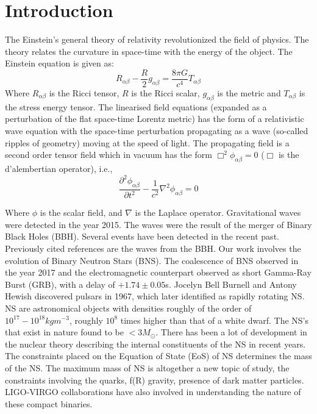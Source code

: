 \documentclass[preprint,12pt]{elsarticle}
\begin{document}

\section{Introduction}
\label{S:1}
The Einstein's general theory of relativity revolutionized the field of physics\citep{Einstein:1916}. The theory relates the curvature in space-time with the energy of the object. The Einstein equation is given as:
\begin{equation}
R_{\alpha\beta}-\frac{R}{2}g_{\alpha\beta} = \frac{8\pi G}{c^4}T_{\alpha\beta}    
\end{equation}
Where $R_{\alpha\beta}$ is the Ricci tensor, $R$ is the Ricci scalar, $g_{\alpha\beta}$ is the metric and $T_{\alpha\beta}$ is the stress energy tensor. The linearised field equations (expanded as a perturbation of the flat space-time Lorentz metric) has the form of a relativistic wave equation with the space-time perturbation propagating as a wave (so-called ripples of geometry) moving at the speed of light. The propagating field is a second order tensor field which in vacuum has the form $\Box^2 \phi_{\alpha \beta}=0$\citep{Einstein:1918} ($\Box$ is the d'alembertian operator), i.e.,
\begin{equation}
\frac{\partial^2 \phi_{\alpha \beta}}{\partial t^2}-\frac{1}{c^2}\nabla^2\phi_{\alpha \beta} = 0
\end{equation}

Where $\phi$ is the scalar field, and $\nabla$ is the Laplace operator. Gravitational waves were detected in the year 2015\citep{Abbott:2016}. The waves were the result of the merger of Binary Black Holes (BBH). Several events have been detected in the recent past\citep{Abbott:2017, Abbott:2017b, Abbott:2017c}. Previously cited references are the waves from the BBH. Our work involves the evolution of Binary Neutron Stars (BNS). The coalescence of BNS observed in the year 2017\citep{Abbott:2017d} and the electromagnetic counterpart observed as short Gamma-Ray Burst (GRB), with a delay of $+ 1.74 \pm 0.05$s\citep{Abbott:2017e, Goldstein:2017}. Jocelyn Bell Burnell and Antony Hewish discovered pulsars in 1967\citep{Hewish:1968}, which later identified as rapidly rotating NS. NS are astronomical objects with densities roughly of the order of $10^{17}-10^{18} kg m^{-3}$\citep{Hartle:1977, Goldman:1989}, roughly $10^8$ times higher than that of a white dwarf. The NS's that exist in nature found to be $<3M_{\odot}$. There has been a lot of development in the nuclear theory describing the internal constituents of the NS in recent years. The constraints placed on the Equation of State (EoS) of NS determines the mass of the NS. The maximum mass of NS is altogether a new topic of study, the constraints involving the quarks\citep{Weber:2006}, f(R) gravity\citep{Capozziello:2016}, presence of dark matter particles\citep{KUMAR:2020}. LIGO-VIRGO collaborations have also involved in understanding the nature of these compact binaries.\\
\end{document}
